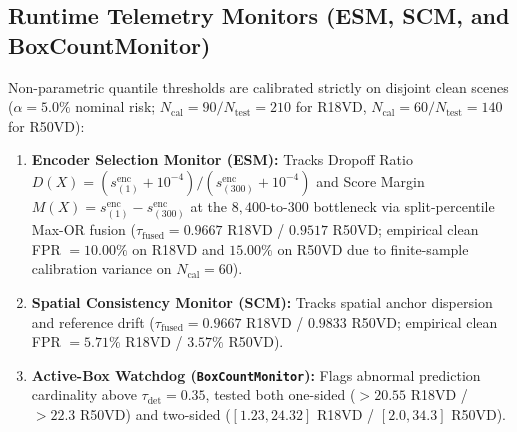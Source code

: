 \documentclass[preprint,10pt]{elsarticle}
\begin{document}
\subsection{Runtime Telemetry Monitors (ESM, SCM, and BoxCountMonitor)}
Non-parametric quantile thresholds are calibrated strictly on disjoint clean scenes ($\alpha = 5.0\%$ nominal risk; $N_{\mathrm{cal}} = 90 / N_{\mathrm{test}} = 210$ for R18VD, $N_{\mathrm{cal}} = 60 / N_{\mathrm{test}} = 140$ for R50VD):
\begin{enumerate}
    \item \textbf{Encoder Selection Monitor (ESM):} Tracks Dropoff Ratio $D(X) = (s_{(1)}^{\mathrm{enc}} + 10^{-4}) / (s_{(300)}^{\mathrm{enc}} + 10^{-4})$ and Score Margin $M(X) = s_{(1)}^{\mathrm{enc}} - s_{(300)}^{\mathrm{enc}}$ at the $8,400$-to-$300$ bottleneck via split-percentile Max-OR fusion ($\tau_{\mathrm{fused}} = 0.9667$ R18VD / $0.9517$ R50VD; empirical clean FPR $= 10.00\%$ on R18VD and $15.00\%$ on R50VD due to finite-sample calibration variance on $N_{\mathrm{cal}}=60$).
    \item \textbf{Spatial Consistency Monitor (SCM):} Tracks spatial anchor dispersion and reference drift ($\tau_{\mathrm{fused}} = 0.9667$ R18VD / $0.9833$ R50VD; empirical clean FPR $= 5.71\%$ R18VD / $3.57\%$ R50VD).
    \item \textbf{Active-Box Watchdog (\texttt{BoxCountMonitor}):} Flags abnormal prediction cardinality above $\tau_{\mathrm{det}} = 0.35$, tested both one-sided ($> 20.55$ R18VD / $> 22.3$ R50VD) and two-sided ($[1.23, 24.32]$ R18VD / $[2.0, 34.3]$ R50VD).
\end{enumerate}
\end{document}
